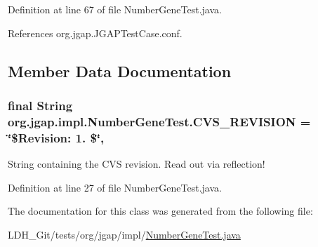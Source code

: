Definition at line 67 of file Number\-Gene\-Test.\-java.



References org.\-jgap.\-J\-G\-A\-P\-Test\-Case.\-conf.



\subsection{Member Data Documentation}
\hypertarget{classorg_1_1jgap_1_1impl_1_1_number_gene_test_ae3f23495ae3cc8290aa288915ebec557}{
\subsubsection[{C\-V\-S\-\_\-\-R\-E\-V\-I\-S\-I\-O\-N}]{\setlength{\rightskip}{0pt plus 5cm}final String org.\-jgap.\-impl.\-Number\-Gene\-Test.\-C\-V\-S\-\_\-\-R\-E\-V\-I\-S\-I\-O\-N = \char`\"{}\$Revision\-: 1. \$\char`\"{}\hspace{0.3cm}{\ttfamily [static]}, {\ttfamily [private]}}}\label{classorg_1_1jgap_1_1impl_1_1_number_gene_test_ae3f23495ae3cc8290aa288915ebec557}
String containing the C\-V\-S revision. Read out via reflection! 

Definition at line 27 of file Number\-Gene\-Test.\-java.



The documentation for this class was generated from the following file\-:\begin{DoxyCompactItemize}
\item 
L\-D\-H\-\_\-\-Git/tests/org/jgap/impl/\hyperlink{_number_gene_test_8java}{Number\-Gene\-Test.\-java}\end{DoxyCompactItemize}
